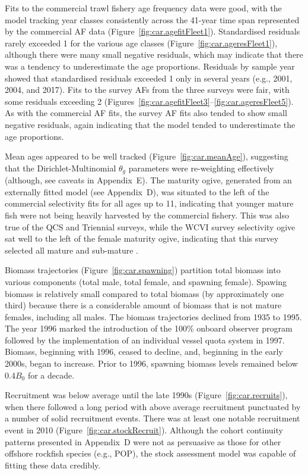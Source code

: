 \documentclass[11pt]{book}
\newcommand{\AppBio}{Appendix~D}
\newcommand{\AppEqn}{Appendix~E}
\newcommand{\pc}{\%}
\begin{document}
Fits to the commercial trawl fishery age frequency data were good, with the model tracking year classes consistently across the 41-year time span represented by the commercial AF data (Figure~\ref{fig:car.agefitFleet1}).
Standardised residuals rarely exceeded 1 for the various age classes (Figure~\ref{fig:car.ageresFleet1}), although there were many small negative residuals, which may indicate that there was a tendency to underestimate the age proportions.
Residuals by sample year showed that standardised residuals exceeded 1 only in several years (e.g., 2001, 2004, and 2017).
Fits to the survey AFs from the three surveys were fair, with some residuals exceeding 2 (Figures~\ref{fig:car.agefitFleet3}--\ref{fig:car.ageresFleet5}).
As with the commercial AF fits, the survey AF fits also tended to show small negative residuals, again indicating that the model tended to underestimate the age proportions.

Mean ages appeared to be well tracked (Figure~\ref{fig:car.meanAge}), suggesting that the Dirichlet-Multinomial $\theta_g$ parameters were re-weighting effectively (although, see caveats in \AppEqn).
The maturity ogive, generated from an externally fitted model (see \AppBio), was situated to the left of the commercial selectivity fits for all ages up to 11, indicating that younger mature fish were not being heavily harvested by the commercial fishery.
This was also true of the QCS and Triennial surveys, while the WCVI survey selectivity ogive sat well to the left of the female maturity ogive, indicating that this survey selected all mature and sub-mature \SPC.

Biomass trajectories (Figure~\ref{fig:car.spawning}) partition total biomass into various components (total male, total female, and spawning female).
Spawing biomass is relatively small compared to total biomass (by approximately one third) because there is a considerable amount of biomass that is not mature females, including all males.
The biomass trajectories declined from 1935 to 1995.
The year 1996 marked the introduction of the 100\pc{} onboard observer program followed by the implementation of an individual vessel quota system in 1997.
Biomass, beginning with 1996, ceased to decline, and, beginning in the early 2000s, began to increase.
Prior to 1996, spawning biomass levels remained below 0.4$B_0$ for a decade.

Recruitment was below average until the late 1990s (Figure~\ref{fig:car.recruits}), when there followed a long period with above average recruitment punctuated by a number of solid recruitment events.
There was at least one notable recruitment event in 2010 (Figure~\ref{fig:car.stockRecruit}).
Although the cohort continuity patterns presented in \AppBio{} were not as persuasive as those for other offshore rockfish species (e.g., POP), the stock assessment model was capable of fitting these data credibly.
\end{document}
